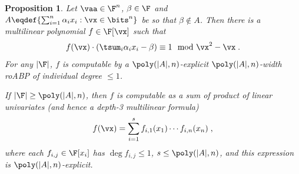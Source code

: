 \documentclass[11pt]{article}
\numberwithin{equation}{section}
\newtheorem{proposition}[theorem]{Proposition}
\theoremstyle{definition}
\theoremstyle{plain}
\begin{document}
\begin{proposition}\label{res:ips-ubs:subset}
        Let $\vaa\in\F^n$, $\beta\in\F$ and $A\eqdef\{\sum_{i=1}^n \alpha_i x_i : \vx\in\bits^n\}$ be so that $\beta\notin A$. Then there is a multilinear polynomial $f\in\F[\vx]$ such that
        \[
                f(\vx)\cdot \left(\tsum_i \alpha_i x_i-\beta\right)\equiv 1\mod  \vx^2-\vx
                \;.
        \]
        For any $|\F|$, $f$ is computable by a $\poly(|A|,n)$-explicit $\poly(|A|,n)$-width roABP of individual degree $\le 1$.

        If $|\F|\ge\poly(|A|,n)$, then $f$ is computable as a sum of product of linear univariates (and hence a depth-3 multilinear formula)
        \[
                f(\vx)=\sum_{i=1}^s f_{i,1}(x_1)\cdots f_{i,n}(x_n)
                \;,
        \]
        where each $f_{i,j}\in\F[x_i]$ has $\deg f_{i,j}\le 1$, $s\le \poly(|A|,n)$, and this expression is $\poly(|A|,n)$-explicit.
\end{proposition}
\end{document}
